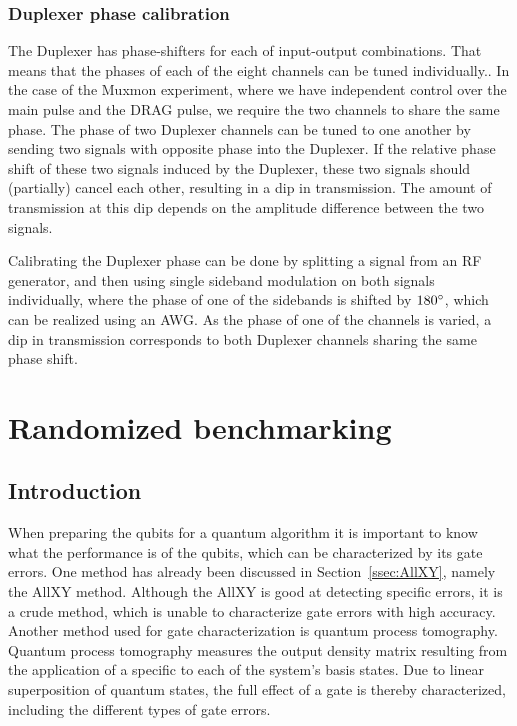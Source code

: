       \subsection{Duplexer phase calibration}
        \label{ssec:Duplexer phase calibration}
        The Duplexer has phase-shifters for each of input-output combinations. That means that the phases of each of the eight channels can be tuned individually.. In the case of the Muxmon experiment, where we have independent control over the main pulse and the DRAG pulse, we require the two channels to share the same phase. The phase of two Duplexer channels can be tuned to one another by sending two signals with opposite phase into the Duplexer. If the relative phase shift of these two signals induced by the Duplexer, these two signals should (partially) cancel each other, resulting in a dip in transmission. The amount of transmission at this dip depends on the amplitude difference between the two signals.

        Calibrating the Duplexer phase can be done by splitting a signal from an RF generator, and then using single sideband modulation on both signals individually, where the phase of one of the sidebands is shifted by $180 \degree$, which can be realized using an AWG. As the phase of one of the channels is varied, a dip in transmission corresponds to both Duplexer channels sharing the same phase shift.


  \chapter{Randomized benchmarking}
    \label{ch:randomized benchmarking}

    \section{Introduction}
      \label{sec:RB introduction}
      When preparing the qubits for a quantum algorithm it is important to know what the performance is of the qubits, which can be characterized by its gate errors. One method has already been discussed in Section~\ref{ssec:AllXY}, namely the AllXY method. Although the AllXY is good at detecting specific errors, it is a crude method, which is unable to characterize gate errors with high accuracy. Another method used for gate characterization is quantum process tomography. Quantum process tomography measures the output density matrix resulting from the application of a specific to each of the system's basis states. Due to linear superposition of quantum states, the full effect of a gate is thereby characterized, including the different types of gate errors.

